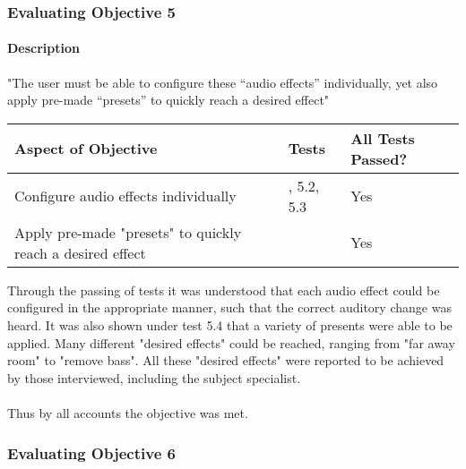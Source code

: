 \pagebreak
\subsubsection{Evaluating Objective 5}
\paragraph{Description} "The user must be able to configure these “audio effects” individually, yet also apply pre-made “presets”
to quickly reach a desired effect"

{
	\renewcommand{\arraystretch}{1.7}
	\begin{table}[h!]
		\begin{center}
			\begin{tabularx}{1.0 \textwidth} {
					| >{\raggedright\arraybackslash}X
					| >{\raggedright\arraybackslash}X
					| >{\raggedright\arraybackslash}X
					|
				}
				\hline
				Aspect of Objective & Tests  & All Tests Passed? \\
				
				\hline
				Configure audio effects individually & 5.1, 5.2, 5.3 & Yes\\
				
				\hline
				Apply pre-made "presets" to quickly reach a desired effect & 5.4 & Yes\\
				
				\hline
			\end{tabularx}
		\end{center}
	\end{table}
}

Through the passing of tests it was understood that each audio effect could be configured in the appropriate manner, such that the correct auditory change was heard. It was also shown under test 5.4 that a variety of presents were able to be applied. Many different "desired effects" could be reached, ranging from "far away room" to "remove bass". All these "desired effects" were reported to be achieved by those interviewed, including the subject specialist.

\paragraph{}
Thus by all accounts the objective was met.

\pagebreak
\subsubsection{Evaluating Objective 6}
